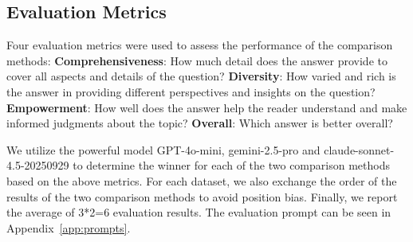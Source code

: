 \documentclass[11pt]{article}
\begin{document}
\subsection{Evaluation Metrics}
Four evaluation metrics were used to assess the performance of the comparison methods:
\textbf{Comprehensiveness}: How much detail does the answer provide to cover all aspects and details of the question?
\textbf{Diversity}: How varied and rich is the answer in providing different perspectives and insights on the question?
\textbf{Empowerment}: How well does the answer help the reader understand and make informed judgments about the topic?
\textbf{Overall}: Which answer is better overall?


We utilize the powerful model GPT-4o-mini, gemini-2.5-pro and claude-sonnet-4.5-20250929 to determine the winner for each of the two comparison methods based on the above metrics. For each dataset, we also exchange the order of the results of the two comparison methods to avoid position bias. Finally, we report the average of 3*2=6 evaluation results.
The evaluation prompt can be seen in Appendix~\ref{app:prompts}.


\end{document}
